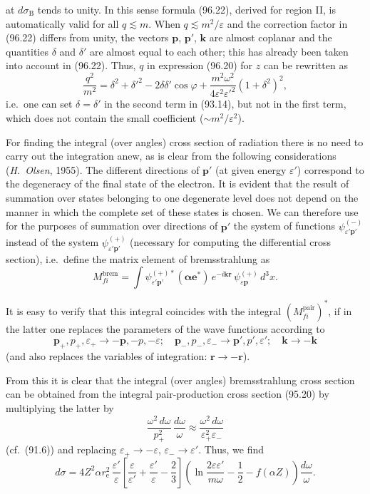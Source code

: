 
at $d\sigma_\text{B}$ tends to unity. In this sense formula (96.22), derived for region II, is automatically valid for all $q \lesssim m$. When $q \lesssim m^2/\varepsilon$ and the correction factor in (96.22) differs from unity, the vectors $\mathbf{p}$, $\mathbf{p}'$, $\mathbf{k}$ are almost coplanar and the quantities $\delta$ and $\delta'$ are almost equal to each other; this has already been taken into account in (96.22). Thus, $q$ in expression (96.20) for $z$ can be rewritten as
\begin{equation}
\frac{q^2}{m^2} = \delta^2 + \delta'^2 - 2\delta\delta'\cos\varphi + \frac{m^2\omega^2}{4\varepsilon^2\varepsilon'^2}(1+\delta^2)^2,
\label{eq:96.23}
\end{equation}
i.e.\ one can set $\delta = \delta'$ in the second term in (93.14), but not in the first term, which does not contain the small coefficient ($\sim m^2/\varepsilon^2$).

For finding the integral (over angles) cross section of radiation there is no need to carry out the integration anew, as is clear from the following considerations (\emph{H.~Olsen}, 1955). The different directions of $\mathbf{p}'$ (at given energy $\varepsilon'$) correspond to the degeneracy of the final state of the electron. It is evident that the result of summation over states belonging to one degenerate level does not depend on the manner in which the complete set of these states is chosen. We can therefore use for the purposes of summation over directions of $\mathbf{p}'$ the system of functions $\psi_{\varepsilon'\mathbf{p}'}^{(-)}$ instead of the system $\psi_{\varepsilon'\mathbf{p}'}^{(+)}$ (necessary for computing the differential cross section), i.e.\ define the matrix element of bremsstrahlung as
\[
M_{fi}^\text{brem} = \int\psi_{\varepsilon'\mathbf{p}'}^{(+)*}(\boldsymbol{\alpha}\mathbf{e}^*)\,e^{-i\mathbf{k}\mathbf{r}}\,\psi_{\varepsilon\mathbf{p}}^{(+)}\,d^3x.
\]

It is easy to verify that this integral coincides with the integral $(M_{fi}^\text{pair})^*$, if in the latter one replaces the parameters of the wave functions according to
\[
\mathbf{p}_+, p_+, \varepsilon_+ \to -\mathbf{p}, -p, -\varepsilon; \quad \mathbf{p}_-, p_-, \varepsilon_- \to \mathbf{p}', p', \varepsilon'; \quad \mathbf{k} \to -\mathbf{k}
\]
(and also replaces the variables of integration: $\mathbf{r} \to -\mathbf{r}$).

From this it is clear that the integral (over angles) bremsstrahlung cross section can be obtained from the integral pair-production cross section (95.20) by multiplying the latter by
\[
\frac{\omega^2\,d\omega}{p_+^2}\,\frac{d\omega}{\omega} \approx \frac{\omega^2\,d\omega}{\varepsilon_+^2\varepsilon_-}
\]
(cf.\ (91.6)) and replacing $\varepsilon_+ \to -\varepsilon$, $\varepsilon_- \to \varepsilon'$. Thus, we find
\begin{equation}
d\sigma = 4Z^2\alpha r_\mathrm{e}^2\,\frac{\varepsilon'}{\varepsilon}\!\left[\frac{\varepsilon}{\varepsilon'} + \frac{\varepsilon'}{\varepsilon} - \frac{2}{3}\right]\!\left(\ln\frac{2\varepsilon\varepsilon'}{m\omega} - \frac{1}{2} - f(\alpha Z)\right)\frac{d\omega}{\omega}.
\label{eq:96.24}
\end{equation}

